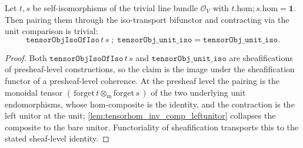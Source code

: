 \begin{lemma}



  \label{lem:tensorobjisoofiso_comp_unit_iso}
  Let \(t, s\) be self-isomorphisms of the trivial line bundle \(\mathcal O_V\) with
  \(t.\mathrm{hom} \mathbin{;} s.\mathrm{hom} = \mathbf 1\). Then pairing them through the
  iso-transport bifunctor and contracting via the unit comparison is trivial:
  \[
    \mathtt{tensorObjIsoOfIso}\,t\,s \;\mathbin{;}\; \mathtt{tensorObj\_unit\_iso}
      = \mathtt{tensorObj\_unit\_iso}.
  \]
\end{lemma}
\begin{proof}
  Both \(\mathtt{tensorObjIsoOfIso}\,t\,s\) and \(\mathtt{tensorObj\_unit\_iso}\) are sheafifications
  of presheaf-level constructions, so the claim is the image under the sheafification functor of a
  presheaf-level coherence. At the presheaf level the pairing is the monoidal tensor
  \((\,\mathrm{forget}\,t \otimes_{\mathrm m} \mathrm{forget}\,s\,)\) of the two underlying unit
  endomorphisms, whose hom-composite is the identity, and the contraction is the left unitor at the
  unit; \cref{lem:tensorhom_inv_comp_leftunitor} collapses the composite to the bare unitor.
  Functoriality of sheafification transports this to the stated sheaf-level identity.
\end{proof}

